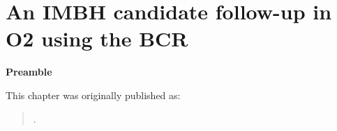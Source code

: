 \chapter[IMBH Search]{An IMBH candidate follow-up in O2 using the BCR}
\label{ch.bcr}


\textbf{Preamble}

This chapter was originally published as:

\begin{quote}
.
\end{quote}


